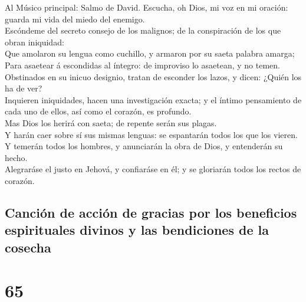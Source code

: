  Al Músico principal: Salmo de David. Escucha, oh Dios, mi
voz en mi oración: guarda mi vida del miedo del enemigo.\\
 Escóndeme del secreto consejo de los malignos; de la
conspiración de los que obran iniquidad:\\
 Que amolaron su lengua como cuchillo, y armaron por su
saeta palabra amarga;\\
 Para asaetear á escondidas al íntegro: de improviso lo
asaetean, y no temen.\\
 Obstinados en su inicuo designio, tratan de esconder los
lazos, y dicen: ¿Quién los ha de ver?\\
 Inquieren iniquidades, hacen una investigación exacta; y
el íntimo pensamiento de cada uno de ellos, así como el corazón, es
profundo.\\
 Mas Dios los herirá con saeta; de repente serán sus
plagas.\\
 Y harán caer sobre sí sus mismas lenguas: se espantarán
todos los que los vieren.\\
 Y temerán todos los hombres, y anunciarán la obra de
Dios, y entenderán su hecho.\\
 Alegraráse el justo en Jehová, y confiaráse en él; y se
gloriarán todos los rectos de corazón.

\hypertarget{canciuxf3n-de-acciuxf3n-de-gracias-por-los-beneficios-espirituales-divinos-y-las-bendiciones-de-la-cosecha}{%
\subsection{Canción de acción de gracias por los beneficios espirituales
divinos y las bendiciones de la
cosecha}\label{canciuxf3n-de-acciuxf3n-de-gracias-por-los-beneficios-espirituales-divinos-y-las-bendiciones-de-la-cosecha}}

\hypertarget{section-64}{%
\section{65}\label{section-64}}

